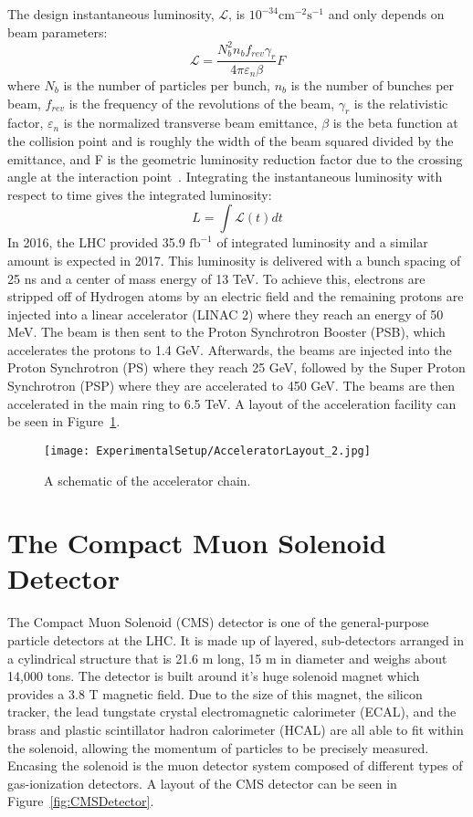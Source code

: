 The design instantaneous luminosity, $\mathcal{L}$, is $10^{-34}\mathrm{cm}^{-2}\mathrm{s}^{-1}$ and only depends on beam parameters:
\begin{equation}
\mathcal{L} = \frac{N_{b}^{2}n_{b}f_{rev}\gamma_{r}}{4\pi\varepsilon_{n}\beta}F
\end{equation}
where $N_{b}$ is the number of particles per bunch, $n_{b}$ is the number of bunches per beam, $f_{rev}$ is the frequency of the revolutions of the beam, $\gamma_{r}$ is the relativistic factor, $\varepsilon_{n}$ is the normalized transverse beam emittance, $\beta$ is the beta function at the collision point and is roughly the width of the beam squared divided by the emittance, and F is the geometric luminosity reduction factor due to the crossing angle at the interaction point~\cite{LHCMachine}. Integrating the instantaneous luminosity with respect to time gives the integrated luminosity:
\begin{equation}
L = \int\mathcal{L}(t)dt
\end{equation}
In 2016, the LHC provided 35.9 $\mathrm{fb}^{-1}$ of integrated luminosity and a similar amount is expected in 2017. This luminosity is delivered with a bunch spacing of 25 ns and a center of mass energy of 13 TeV. To achieve this, electrons are stripped off of Hydrogen atoms by an electric field and the remaining protons are injected into a linear accelerator (LINAC 2) where they reach an energy of 50 MeV. The beam is then sent to the Proton Synchrotron Booster (PSB), which accelerates the protons to 1.4 GeV. Afterwards, the beams are injected into the Proton Synchrotron (PS) where they reach 25 GeV, followed by the Super Proton Synchrotron (PSP) where they are accelerated to 450 GeV. The beams are then accelerated in the main ring to 6.5 TeV. A layout of the acceleration facility can be seen in Figure~\ref{fig:AcceleratorLayout}\cite{LHCLayout}.

\begin{figure}[htbp]
\texttt{[image: ExperimentalSetup/AcceleratorLayout\_2.jpg]}
\caption{A schematic of the accelerator chain.}
\label{fig:AcceleratorLayout}
\end{figure}

\section{The Compact Muon Solenoid Detector}
The Compact Muon Solenoid (CMS) detector is one of the general-purpose particle detectors at the LHC. It is made up of layered, sub-detectors arranged in a cylindrical structure that is 21.6 m long, 15 m in diameter and weighs about 14,000 tons. The detector is built around it’s huge solenoid magnet which provides a 3.8 T magnetic field. Due to the size of this magnet, the silicon tracker, the lead tungstate crystal electromagnetic calorimeter (ECAL), and the brass and plastic scintillator hadron calorimeter (HCAL) are all able to fit within the solenoid, allowing the momentum of particles to be precisely measured. Encasing the solenoid is the muon detector system composed of different types of gas-ionization detectors. A layout of the CMS detector can be seen in Figure~\ref{fig:CMSDetector}.

